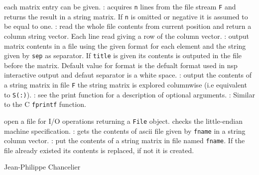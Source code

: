 \begin{itemize}
  each matrix entry can be given. 
  : acquires \verb+n+ lines from the file stream \verb+F+ and returns 
  the result in a string matrix. If \verb+n+ is omitted or negative it is assumed to be equal to 
  one. 
  : read the whole file contents from current position
  and return a column string vector. Each line read giving a row of the column vector.
  : 
    output  matrix contents in a file using the given format for each element 
    and the string given by \verb+sep+ as separator. If \verb+title+ is given 
    its contents is outputed in the file before the matrix. Default value 
    for format is the defualt format used in nsp interactive output and defaut 
    separator is a white space.
  : output the contents of a string matrix in file \verb+F+ 
  the string matrix is explored columnwise (i.e equivalent to \verb+S(:)+).
  : 
  see the print function for a description of optional arguments.
  : Similar to the C \verb+fprintf+ function. 
\end{itemize}

\begin{itemize}
   open a file for I/O operations returning a \verb+File+ object.
   checks the little-endian machine specification.
  : gets the contents of ascii file given by \verb+fname+ 
  in a string column vector.
  : put the contents of a string matrix in file named 
  \verb+fname+. If the file already existed its contents is replaced, if not it is 
  created. 
\end{itemize}

\begin{examples}
  \begin{program}
  \end{program}
\end{examples}

\begin{manseealso}
\end{manseealso}

\begin{authors}
  Jean-Philippe Chancelier 
\end{authors}


